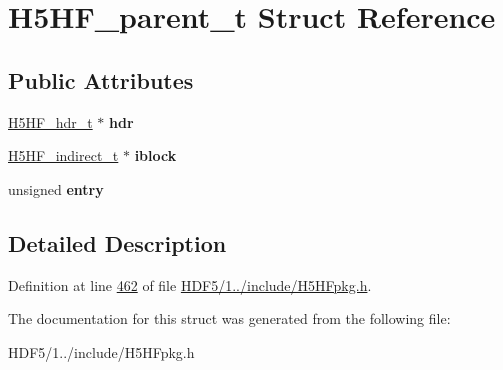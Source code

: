 \hypertarget{struct_h5_h_f__parent__t}{}\section{H5\+H\+F\+\_\+parent\+\_\+t Struct Reference}
\label{struct_h5_h_f__parent__t}
\subsection*{Public Attributes}
\begin{DoxyCompactItemize}
\item 
\mbox{\label{struct_h5_h_f__parent__t_acdc066e40544931e59d0d1e3167442fb}} 
\hyperlink{struct_h5_h_f__hdr__t}{H5\+H\+F\+\_\+hdr\+\_\+t} $\ast$ {\bfseries hdr}
\item 
\mbox{\label{struct_h5_h_f__parent__t_ab12a224444c9f6dd3098406a9c43b954}} 
\hyperlink{struct_h5_h_f__indirect__t}{H5\+H\+F\+\_\+indirect\+\_\+t} $\ast$ {\bfseries iblock}
\item 
\mbox{\label{struct_h5_h_f__parent__t_ac124bc13749000a5fcf580f3e34a2f17}} 
unsigned {\bfseries entry}
\end{DoxyCompactItemize}


\subsection{Detailed Description}


Definition at line \hyperlink{_h_d_f5_21_810_81_2include_2_h5_h_fpkg_8h_source_l00462}{462} of file \hyperlink{_h_d_f5_21_810_81_2include_2_h5_h_fpkg_8h_source}{H\+D\+F5/1../include/\+H5\+H\+Fpkg.\+h}.



The documentation for this struct was generated from the following file\+:\begin{DoxyCompactItemize}
\item 
H\+D\+F5/1../include/\+H5\+H\+Fpkg.\+h\end{DoxyCompactItemize}
